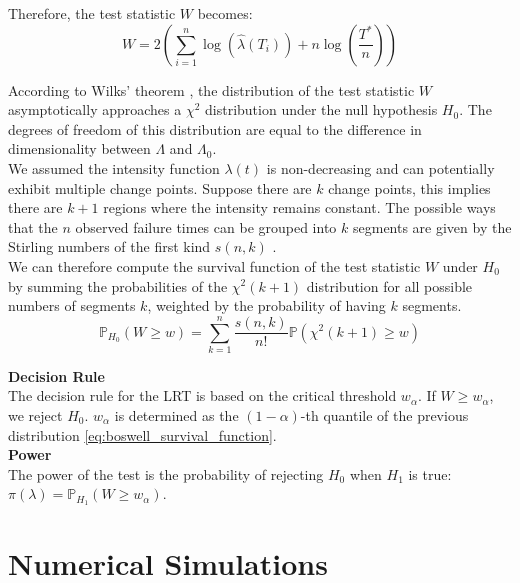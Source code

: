 \documentclass{journalstyle}
\begin{document}
Therefore, the test statistic $W$ becomes:
\begin{equation}
    W = 2 \left( \sum_{i=1}^{n} \log(\hat{\lambda}(T_i)) + n \log\left(\frac{T^*}{n}\right) \right)
    \label{eq:boswell_test_statistic}
\end{equation}

According to Wilks' theorem \cite{Wilks1938}, the distribution of the test statistic $W$ asymptotically approaches a $\chi^2$ distribution under the null hypothesis $H_0$.
The degrees of freedom of this distribution are equal to the difference in dimensionality between $\Lambda$ and $\Lambda_0$. \\

We assumed the intensity function $\lambda(t)$ is non-decreasing and can potentially exhibit multiple change points.
Suppose there are $k$ change points, this implies there are $k + 1$ regions where the intensity remains constant.
The possible ways that the $n$ observed failure times can be grouped into $k$ segments are given by the Stirling numbers of the first kind $s(n, k)$ \cite{StirlingNumbers}. \\
We can therefore compute the survival function of the test statistic $W$ under $H_0$ by summing the probabilities of the $\chi^2(k+1)$ distribution for all possible numbers of segments $k$, weighted by the probability of having $k$ segments.
\begin{equation}
    \mathbb{P}_{H_0}(W \geq w) = \sum_{k=1}^{n} \frac{s(n, k)}{n!} \mathbb{P}(\chi^2(k+1) \geq w)
    \label{eq:boswell_survival_function}
\end{equation}


\noindent\textbf{Decision Rule} \\
The decision rule for the LRT is based on the critical threshold $w_{\alpha}$. 
If $W \geq w_{\alpha}$, we reject $H_0$. $w_{\alpha}$ is determined as the $(1 - \alpha)$-th quantile of the previous distribution \eqref{eq:boswell_survival_function}. \\

\noindent\textbf{Power} \\
The power of the test is the probability of rejecting $H_0$ when $H_1$ is true: \\
$\pi(\lambda) = \mathbb{P}_{H_1}(W \geq w_{\alpha})$. \\




\section{Numerical Simulations}
\end{document}
